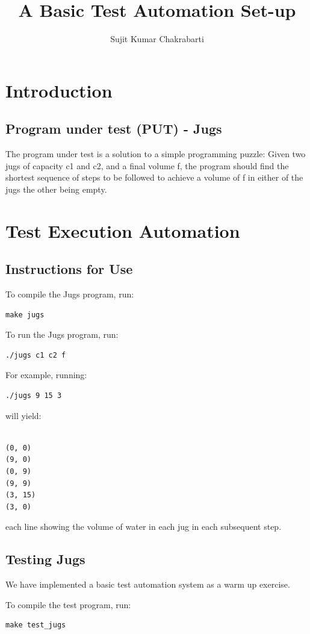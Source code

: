 \documentclass[12pts]{report}
\author{Sujit Kumar Chakrabarti}
\title{A Basic Test Automation Set-up}
\begin{document}
\maketitle
\chapter{Introduction}
\section{Program under test (PUT) - Jugs}

The program under test is a solution to a simple programming puzzle: Given
two jugs of capacity c1 and c2, and a final volume f, the program should
find the shortest sequence of steps to be followed to achieve a volume of
f in either of the jugs the other being empty.


\chapter{Test Execution Automation}
\section{Instructions for Use}
To compile the Jugs program, run:
\begin{lstlisting}[style=oc]
	make jugs
\end{lstlisting}

To run the Jugs program, run:
\begin{lstlisting}[style=oc]
	./jugs c1 c2 f
\end{lstlisting}

For example, running:
\begin{lstlisting}[style=oc]
	./jugs 9 15 3
\end{lstlisting}
will yield:
\begin{lstlisting}[style=oc]

(0, 0)
(9, 0)
(0, 9)
(9, 9)
(3, 15)
(3, 0)
\end{lstlisting}

each line showing the volume of water in each jug in each subsequent step.

\section{Testing Jugs}
We have implemented a basic test automation system as a warm up exercise.

To compile the test program, run:
\begin{lstlisting}[style=oc]
	make test_jugs
\end{lstlisting}
\end{document}

